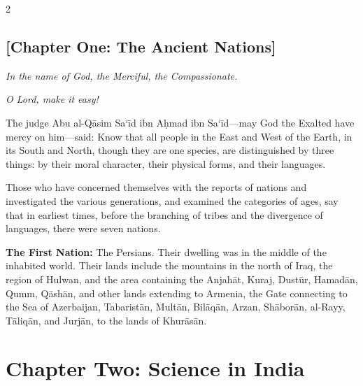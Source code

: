 \documentclass[11pt,a4paper]{article}
\begin{document}
\begin{paracol}{2}
\begin{rightcolumn}
\subsection*{[Chapter One: The Ancient Nations]}
\vspace{0.3cm}
\textit{In the name of God, the Merciful, the Compassionate.}

\vspace{0.2cm}
\textit{O Lord, make it easy!}

\vspace{0.4cm}
The judge Abu al-Q\={a}sim Sa\textquoteleft \={i}d ibn A\d{h}mad ibn Sa\textquoteleft \={i}d---may God the Exalted have mercy on him---said: Know that all people in the East and West of the Earth, in its South and North, though they are one species, are distinguished by three things: by their moral character, their physical forms, and their languages.

\vspace{0.3cm}
Those who have concerned themselves with the reports of nations and investigated the various generations, and examined the categories of ages, say that in earliest times, before the branching of tribes and the divergence of languages, there were seven nations.

\vspace{0.3cm}
\textbf{The First Nation:} The Persians. Their dwelling was in the middle of the inhabited world. Their lands include the mountains in the north of Iraq, the region of Hulwan, and the area containing the Anjah\={a}t, Kuraj, Dust\={u}r, Hamad\={a}n, Qumm, Q\={a}sh\={a}n, and other lands extending to Armenia, the Gate connecting to the Sea of Azerbaijan, Tabarist\={a}n, Mult\={a}n, Bil\={a}q\={a}n, Arzan, Sh\={a}bor\={a}n, al-Rayy, T\={a}liq\={a}n, and Jurj\={a}n, to the lands of Khur\={a}s\={a}n.
\end{rightcolumn}

\end{paracol}

\clearpage

\section*{Chapter Two: Science in India}
\end{document}
